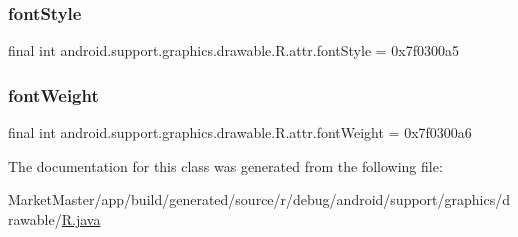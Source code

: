 \subsubsection{\texorpdfstring{font\+Style}{fontStyle}}
{\footnotesize\ttfamily final int android.\+support.\+graphics.\+drawable.\+R.\+attr.\+font\+Style = 0x7f0300a5\hspace{0.3cm}{\ttfamily [static]}}

\mbox{\label{classandroid_1_1support_1_1graphics_1_1drawable_1_1R_1_1attr_ae2c7f9b69aeb5af599fc6de1ba4fbf7c}} 
\subsubsection{\texorpdfstring{font\+Weight}{fontWeight}}
{\footnotesize\ttfamily final int android.\+support.\+graphics.\+drawable.\+R.\+attr.\+font\+Weight = 0x7f0300a6\hspace{0.3cm}{\ttfamily [static]}}



The documentation for this class was generated from the following file\+:\begin{DoxyCompactItemize}
\item 
Market\+Master/app/build/generated/source/r/debug/android/support/graphics/drawable/\mbox{\hyperlink{debug_2android_2support_2graphics_2drawable_2R_8java}{R.\+java}}\end{DoxyCompactItemize}
